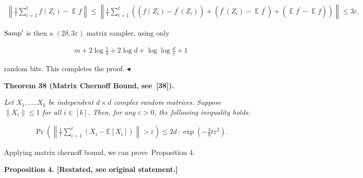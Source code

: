 \[\begin{gathered}
\displaystyle\left\|\frac{1}{t}\sum_{i=1}^{t}f(Z_{i})-\operatorname*{\mathbb{E}}f\right\| \displaystyle\leq\left\|\frac{1}{t}\sum_{i=1}^{t}\left((f(Z_{i})-f^{\prime}(Z_{i}))+(f^{\prime}(Z_{i})-\operatorname*{\mathbb{E}}f^{\prime})+(\operatorname*{\mathbb{E}}f^{\prime}-\operatorname*{\mathbb{E}}f)\right)\right\|\leq 3\varepsilon.
\end{gathered}\]


$\textup{{Samp}}^{\prime}$ is then a $(2\delta,3\varepsilon)$ matrix sampler, using only\par


\[\begin{gathered}
m+2\log\frac{1}{\delta}+2\log d+\log\log\frac{d}{\varepsilon}+1
\end{gathered}\]


random bits.
This completes the proof.
$\blacktriangleleft$\par





\par\medskip\noindent\textbf{
\textbf{Theorem 38}\textbf{ }(Matrix Chernoff Bound, see [38])\textbf{.}
}\par



\emph{Let $X_{1},\dots,X_{k}$ be independent $d\times d$ complex random matrices. Suppose $\|X_{i}\|\leq 1$ for all $i\in[k]$. Then, for any $\varepsilon>0$, the following inequality holds:}\par


\[\begin{gathered}
\Pr\left(\left\|\frac{1}{t}\sum_{i=1}^{t}\left(X_{i}-\mathbb{E}[X_{i}]\right)\right\|>\varepsilon\right)\leq 2d\cdot\exp\left(-\frac{3}{8}t\varepsilon^{2}\right).
\end{gathered}\]






Applying matrix chernoff bound, we can prove Proposition 4.\par






\par\medskip\noindent\textbf{
\textbf{Proposition 4}\textbf{.}
[Restated, see original statement.]}\par




